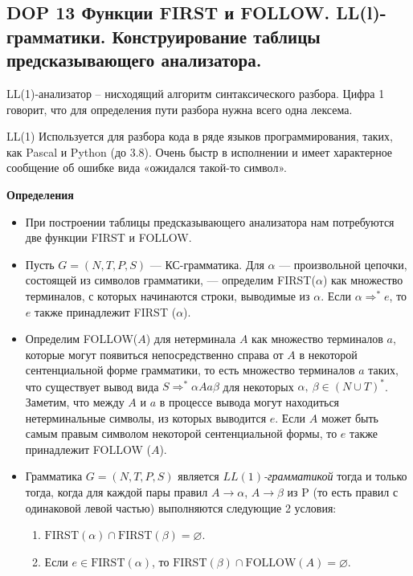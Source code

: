 \subsection*{DOP 13 Функции FIRST и FOLLOW. LL(l)-грамматики. Конструирование таблицы предсказывающего анализатора.}

LL(1)-анализатор -- нисходящий алгоритм синтаксического разбора. Цифра 1 говорит, что для определения пути разбора нужна всего одна лексема.

LL(1) Используется для разбора кода в ряде языков программирования, таких, как Pascal и Python (до 3.8). Очень быстр в исполнении и имеет характерное сообщение об ошибке вида «ожидался такой-то символ».

\textbf{Определения}
\begin{itemize}
    \item При построении таблицы предсказывающего анализатора нам потребуются две функции FIRST и FOLLOW.
    \item Пусть $G = (N, T, P, S)$ --- КС-грамматика.
    Для $\alpha$ --- произвольной цепочки, состоящей из символов грамматики, --- определим FIRST($\alpha$) как множество терминалов, с которых начинаются строки, выводимые из $\alpha$.
    Если $\alpha \Rightarrow^\ast e$, то $e$ также принадлежит FIRST ($\alpha$).
    \item Определим FOLLOW($A$) для нетерминала $A$ как множество терминалов $a$, которые могут появиться непосредственно справа от $A$ в некоторой сентенциальной форме грамматики, то есть множество терминалов $a$ таких, что существует вывод вида $S \Rightarrow^\ast \alpha A a \beta$ для некоторых $\alpha,~\beta \in (N \cup T)^\ast$.
    Заметим, что между $A$ и $a$ в процессе вывода могут находиться нетерминальные символы, из которых выводится $e$.
    Если $A$ может быть самым правым символом некоторой сентенциальной формы, то $e$ также принадлежит FOLLOW ($A$).
    \item Грамматика $G = (N, T, P, S)$ является \textit{$LL(1)$-грамматикой} тогда и только тогда, когда для каждой пары правил $A \rightarrow \alpha$, $A \rightarrow \beta$ из P (то есть правил с одинаковой левой частью) выполняются следующие 2 условия:
    \begin{enumerate}
        \item $\text{FIRST}(\alpha) \cap \text{FIRST}(\beta) = \varnothing$.
        \item Если $e \in \text{FIRST}(\alpha)$, то $\text{FIRST}(\beta) \cap \text{FOLLOW}(A) = \varnothing$.
    \end{enumerate}
\end{itemize}


